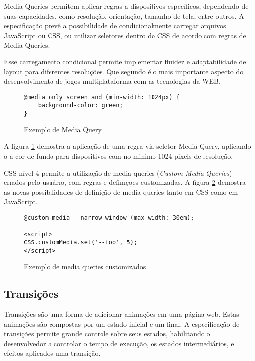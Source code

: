 Media Queries permitem aplicar regras a dispositivos específicos,
dependendo de suas capacidades, como resolução, orientação, tamanho
de tela, entre outros. A especificação prevê a possibilidade de
condicionalmente carregar arquivos JavaScript ou CSS, ou utilizar
seletores dentro do CSS de acordo com regras de Media Queries.

Esse carregamento condicional  permite implementar fluidez e
adaptabilidade de layout para diferentes resoluções. Que segundo
\cite{HTML5CrossPlatformGameDevelopment} é o mais importante aspecto do
desenvolvimento de jogos multiplataforma com as tecnologias da WEB.

\begin{figure}
\centering
\begin{verbatim}
@media only screen and (min-width: 1024px) {
    background-color: green;
}
\end{verbatim}
\caption{Exemplo de Media Query}
\label{fig:MediaQuery}
\end{figure}

A figura \ref{fig:MediaQuery} demostra a aplicação de uma regra via
seletor Media Query, aplicando o a cor de fundo para dispositivos com no
minimo 1024 pixels de resolução.

CSS nível 4 permite a utilização de media queries (\textit{Custom
Media Queries}) criados pelo usuário, com regras e definições
customizadas. A figura \ref{fig:MediaQueryCustom} demostra as novas
possibilidades de definição de media queries tanto em CSS como em
JavaScript.

\begin{figure}
\centering
\begin{verbatim}
@custom-media --narrow-window (max-width: 30em);

<script>
CSS.customMedia.set('--foo', 5);
</script>

\end{verbatim}
\caption{Exemplo de media queries customizados}
\label{fig:MediaQueryCustom}
\end{figure}


\subsection{Transições}

Transições são uma forma de adicionar animações em uma página
web. Estas animações são compostas por um estado inicial e um final.
A especificação de transições permite grande controle sobre seus
estados, habilitando o desenvolvedor a controlar o tempo de execução,
os estados intermediários, e efeitos aplicados uma transição.

